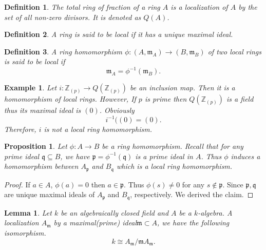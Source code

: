 \documentclass{article}
\newtheorem{proposition}{Proposition}[section]
\newtheorem{definition}{Definition}[section]
\newtheorem{lemma}{Lemma}[section]
\newtheorem{example}{Example}[section]
\numberwithin{equation}{section}
\begin{document}
\begin{definition}
The total ring of fraction of a ring $A$ is a localization of $A$ by the set of all non-zero divisors. It is denoted as $Q(A)$.
\end{definition}

\begin{definition}
A ring is said to be local if it has a unique maximal ideal.
\end{definition}

\begin{definition}
A ring homomorphism $\phi:(A,\mathfrak{m}_A)\to (B,\mathfrak{m}_B)$ of two local rings is said to be local if 
\begin{equation*}
\mathfrak{m}_A = \phi^{-1}(\mathfrak{m}_B).
\end{equation*}
\end{definition}

\begin{example}
Let $i:\mathbb{Z}_{(p)}\to Q(\mathbb{Z}_{(p)})$ be an inclusion map. Then it is a homomorphism of local rings. However, If $p$ is prime then $Q(\mathbb{Z}_{(p)})$ is a field thus its maximal ideal is $(0)$. Obviously
\begin{equation*}
i^{-1}((0) = (0).
\end{equation*}
Therefore, $i$ is not a local ring homomorphism.
\end{example}

\begin{proposition}
Let $\phi:A\to B$ be a ring homomorphism. Recall that for any prime ideal $\mathfrak{q}\subseteq B$, we have $\mathfrak{p}=\phi^{-1}(\mathfrak{q})$ is a prime ideal in $A$. Thus $\phi$ induces a homomorphism between $A_{\mathfrak{p}}$ and $B_{\mathfrak{q}}$ which is a local ring homomorphism.
\end{proposition}

\begin{proof}
If $a\in A$, $\phi(a)=0$ then $a\in\mathfrak{p}$. Thus $\phi(s)\not=0$ for any $s\not\in\mathfrak{p}$. Since $\mathfrak{p},\mathfrak{q}$ are unique maximal ideals of  $A_{\mathfrak{p}}$ and $B_{\mathfrak{q}}$, respectively. We derived the claim.
\end{proof}

\begin{lemma}
Let $k$ be an algebraically closed field and $A$ be a $k$-algebra. A localization $A_{\mathfrak{m}}$ by a maximal(prime) ideal$\mathfrak{m}\subset A$, we have the following isomorphism.
\begin{equation*}
k\cong A_{\mathfrak{m}}/\mathfrak{m}A_{\mathfrak{m}}.
\end{equation*}
\label{k_algebra_localization}
\end{lemma}
\end{document}
